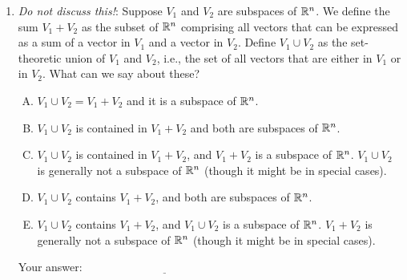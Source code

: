 \documentclass[10pt]{amsart}
\begin{document}
\begin{enumerate}
\item {\em Do not discuss this!}: Suppose $V_1$ and $V_2$ are
  subspaces of $\mathbb{R}^n$. We define the sum $V_1 + V_2$ as the subset of
  $\mathbb{R}^n$ comprising all vectors that can be expressed as a sum of a
  vector in $V_1$ and a vector in $V_2$. Define $V_1 \cup V_2$ as the
  set-theoretic union of $V_1$ and $V_2$, i.e., the set of all vectors
  that are either in $V_1$ or in $V_2$. What can we say about these?

  \begin{enumerate}[(A)]
  \item $V_1 \cup V_2 = V_1 + V_2$ and it is a subspace of $\mathbb{R}^n$.
  \item $V_1 \cup V_2$ is contained in $V_1 + V_2$ and both are subspaces of $\mathbb{R}^n$.
  \item $V_1 \cup V_2$ is contained in $V_1 + V_2$, and $V_1 + V_2$ is
    a subspace of $\mathbb{R}^n$. $V_1 \cup V_2$ is generally not a subspace
    of $\mathbb{R}^n$ (though it might be in special cases).
  \item $V_1 \cup V_2$ contains $V_1 + V_2$, and both are subspaces of $\mathbb{R}^n$.
  \item $V_1 \cup V_2$ contains $V_1 + V_2$, and $V_1 \cup V_2$ is a
    subspace of $\mathbb{R}^n$. $V_1 + V_2$ is generally not a subspace of
    $\mathbb{R}^n$ (though it might be in special cases).
  \end{enumerate}

  Your answer: $\underline{\qquad\qquad\qquad\qquad\qquad\qquad\qquad}$

\end{enumerate}
\end{document}

